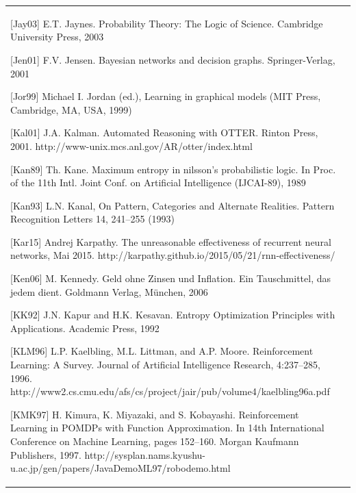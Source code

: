\documentclass[10pt]{book}
\begin{document}
\begin{tabular}{|l|l|}
[Jay03] E.T. Jaynes. Probability Theory: The Logic of Science. Cambridge University Press, 2003

[Jen01] F.V. Jensen. Bayesian networks and decision graphs. Springer-Verlag, 2001

[Jor99] Michael I. Jordan (ed.), Learning in graphical models (MIT Press, Cambridge, MA, USA, 1999)

[Kal01] J.A. Kalman. Automated Reasoning with OTTER. Rinton Press, 2001. http://www-unix.mcs.anl.gov/AR/otter/index.html

[Kan89] Th. Kane. Maximum entropy in nilsson’s probabilistic logic. In Proc. of the 11th Intl. Joint Conf. on Artificial Intelligence (IJCAI-89), 1989

[Kan93] L.N. Kanal, On Pattern, Categories and Alternate Realities. Pattern Recognition Letters 14, 241–255 (1993)

[Kar15] Andrej Karpathy. The unreasonable effectiveness of recurrent neural networks, Mai 2015. http://karpathy.github.io/2015/05/21/rnn-effectiveness/

[Ken06] M. Kennedy. Geld ohne Zinsen und Inflation. Ein Tauschmittel, das jedem dient. Goldmann Verlag, München, 2006

[KK92] J.N. Kapur and H.K. Kesavan. Entropy Optimization Principles with Applications. Academic Press, 1992

[KLM96] L.P. Kaelbling, M.L. Littman, and A.P. Moore. Reinforcement Learning: A Survey. Journal of Artificial Intelligence Research, 4:237–285, 1996. http://www2.cs.cmu.edu/afs/cs/project/jair/pub/volume4/kaelbling96a.pdf

[KMK97] H. Kimura, K. Miyazaki, and S. Kobayashi. Reinforcement Learning in POMDPs with Function Approximation. In 14th International Conference on Machine Learning, pages 152–160. Morgan Kaufmann Publishers, 1997. http://sysplan.nams.kyushu-u.ac.jp/gen/papers/JavaDemoML97/robodemo.html


\end{tabular}
\end{document}
